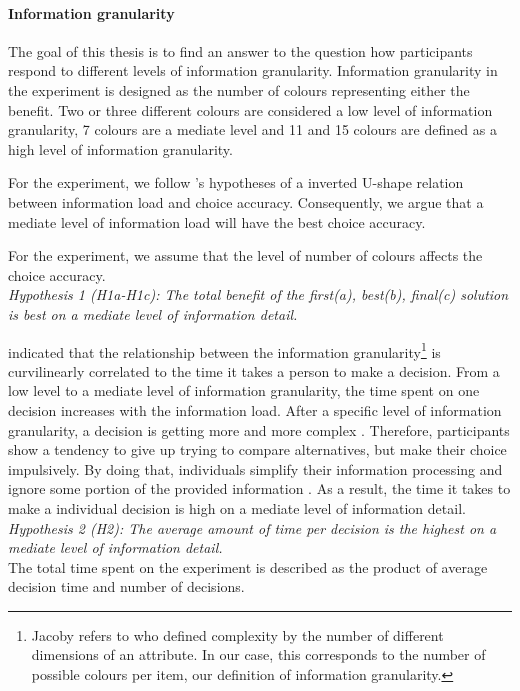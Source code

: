 \paragraph{Information granularity}
The goal of this thesis is to find an answer to the question how participants respond to different levels of information granularity.
Information granularity in the experiment is designed as the number of colours representing either the benefit.  Two or three different colours are considered a low level of information granularity, 7 colours are a mediate level and 11 and 15 colours are defined as a high level of information granularity.

For the experiment, we follow \cite{Jacoby1974}'s hypotheses of a inverted U-shape relation between information load and choice accuracy. Consequently, we argue that a mediate level of information load will have the best choice accuracy.

For the experiment, we assume that the level of number of colours affects the choice accuracy.\\
\textit{Hypothesis 1 (H1a-H1c): The total benefit of the first(a), best(b), final(c) solution is best on a mediate level of information detail.}

\cite{Jacoby1974} indicated that the relationship between the information granularity\footnote{Jacoby refers to \cite{Hendrick1968} who defined complexity by the number of different dimensions of an attribute. In our case, this corresponds to the number of possible colours per item, our definition of information granularity. }  is curvilinearly correlated to the time it takes a person to make a decision. From a low level to a mediate level of information granularity, the time spent on one decision increases with the information load. After a specific level of information granularity, a decision is getting more and more complex \citep{Hendrick1968}. Therefore, participants show a tendency to give up trying to compare alternatives, but make their choice impulsively. By doing that, individuals simplify their information processing and ignore some portion of the provided information \citep{Malhotra1982}.
As a result, the time it takes to make a individual decision is high on a mediate level of information detail. 
\textit{Hypothesis 2 (H2): The average amount of time per decision is the highest on a mediate level of information detail.}\\
The total time spent on the experiment is described as the product of average decision time and number of decisions. 

